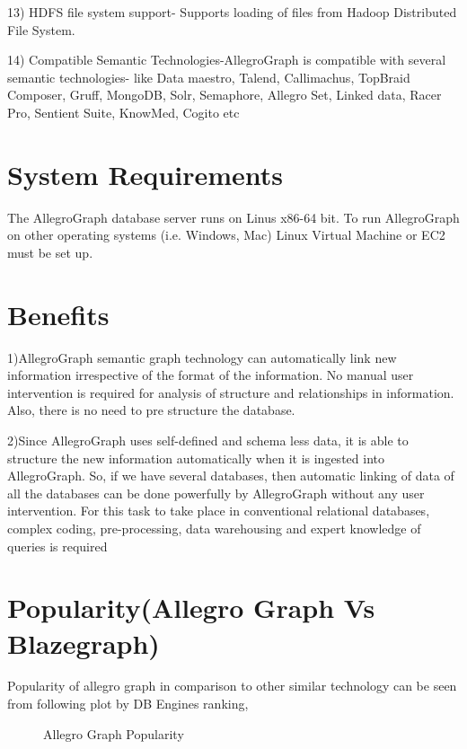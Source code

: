 \documentclass[9pt,twocolumn,twoside]{../../styles/osajnl}
\begin{document}
13) HDFS file system support- Supports loading of files from Hadoop Distributed File System.

14) Compatible Semantic Technologies-AllegroGraph is compatible with several semantic technologies-
like Data maestro, Talend, Callimachus, TopBraid Composer, Gruff, MongoDB, Solr, Semaphore, Allegro Set, Linked data, Racer Pro, Sentient Suite, KnowMed, Cogito etc \cite{fag}

\section{System Requirements}
The AllegroGraph database server runs on Linus x86-64 bit. To run AllegroGraph on other operating systems (i.e. Windows, Mac) Linux Virtual Machine or EC2 must be set up.
\cite{fag}

\section{Benefits}
1)AllegroGraph semantic graph technology can automatically link new information irrespective of the format of the information. No manual user intervention is required for analysis of structure and relationships in information. Also, there is no need to pre structure the database.

2)Since AllegroGraph uses self-defined and schema less data, it is able to structure the new information automatically when it is ingested into AllegroGraph. So, if we have several databases, then automatic linking of data of all the databases can be done powerfully by AllegroGraph without any user intervention. For this task to take place in conventional relational databases, complex coding, pre-processing, data warehousing and expert knowledge of queries is required \cite{fag}

\section{Popularity(Allegro Graph Vs Blazegraph)}
Popularity of allegro graph in comparison to other similar technology can be seen from following plot by DB Engines ranking,

\begin{figure}[htbp]
	\centering
	\caption{Allegro Graph Popularity}
	\label{fig:Allegro-Popularity}
\end{figure}
\cite{dbe}
\end{document}

